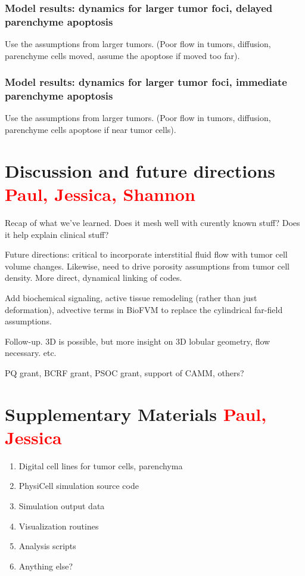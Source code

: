 \documentclass[smallextended,natbib,draft]{svjour3}
\newcommand{\red}[1]{\textcolor{red}{#1}}
\begin{document}
\subsubsection{Model results: dynamics for larger tumor foci, delayed parenchyme apoptosis} 
Use the assumptions from larger tumors. (Poor flow in tumors, diffusion, parenchyme cells moved, 
assume the apoptose if moved too far). 

\subsubsection{Model results: dynamics for larger tumor foci, immediate parenchyme apoptosis} 
Use the assumptions from larger tumors. (Poor flow in tumors, diffusion, parenchyme cells apoptose if near tumor cells). 





\section{Discussion and future directions \red{Paul, Jessica, Shannon}}
Recap of what we've learned. Does it mesh well with curently known stuff? Does it help explain clinical stuff? 

Future directions: critical to incorporate interstitial fluid flow with tumor cell volume changes. Likewise, need to drive porosity assumptions 
from tumor cell density. More direct, dynamical linking of codes. 

Add biochemical signaling, active tissue remodeling (rather than just deformation), advective terms in BioFVM to replace 
the cylindrical far-field assumptions. 

Follow-up. 3D is possible, but more insight on 3D lobular geometry, flow necessary. etc. 


\begin{acknowledgements}
PQ grant, BCRF grant, PSOC grant, support of CAMM, others?
\end{acknowledgements}

\section{Supplementary Materials \red{Paul, Jessica}}
\begin{enumerate}
\item 
Digital cell lines for tumor cells, parenchyma 
\item 
PhysiCell simulation source code
\item 
Simulation output data
\item 
Visualization routines 
\item 
Analysis scripts 
\item 
Anything else? 
\end{enumerate}


\end{document}
